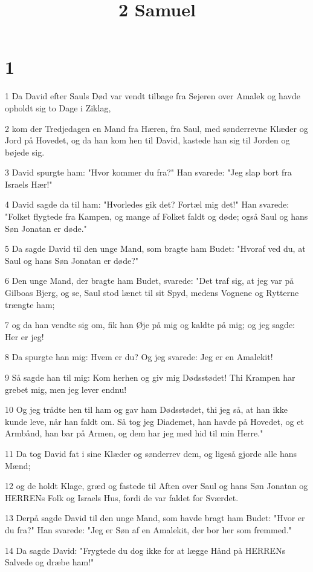 

\title{2 Samuel}


\chapter{1}

\par 1 Da David efter Sauls Død var vendt tilbage fra Sejeren over Amalek og havde opholdt sig to Dage i Ziklag,
\par 2 kom der Tredjedagen en Mand fra Hæren, fra Saul, med sønderrevne Klæder og Jord på Hovedet, og da han kom hen til David, kastede han sig til Jorden og bøjede sig.
\par 3 David spurgte ham: "Hvor kommer du fra?" Han svarede: "Jeg slap bort fra Israels Hær!"
\par 4 David sagde da til ham: "Hvorledes gik det? Fortæl mig det!" Han svarede: "Folket flygtede fra Kampen, og mange af Folket faldt og døde; også Saul og hans Søn Jonatan er døde."
\par 5 Da sagde David til den unge Mand, som bragte ham Budet: "Hvoraf ved du, at Saul og hans Søn Jonatan er døde?"
\par 6 Den unge Mand, der bragte ham Budet, svarede: "Det traf sig, at jeg var på Gilboas Bjerg, og se, Saul stod lænet til sit Spyd, medens Vognene og Rytterne trængte ham;
\par 7 og da han vendte sig om, fik han Øje på mig og kaldte på mig; og jeg sagde: Her er jeg!
\par 8 Da spurgte han mig: Hvem er du? Og jeg svarede: Jeg er en Amalekit!
\par 9 Så sagde han til mig: Kom herhen og giv mig Dødsstødet! Thi Krampen har grebet mig, men jeg lever endnu!
\par 10 Og jeg trådte hen til ham og gav ham Dødsstødet, thi jeg så, at han ikke kunde leve, når han faldt om. Så tog jeg Diademet, han havde på Hovedet, og et Armbånd, han bar på Armen, og dem har jeg med hid til min Herre."
\par 11 Da tog David fat i sine Klæder og sønderrev dem, og ligeså gjorde alle hans Mænd;
\par 12 og de holdt Klage, græd og fastede til Aften over Saul og hans Søn Jonatan og HERRENs Folk og Israels Hus, fordi de var faldet for Sværdet.
\par 13 Derpå sagde David til den unge Mand, som havde bragt ham Budet: "Hvor er du fra?" Han svarede: "Jeg er Søn af en Amalekit, der bor her som fremmed."
\par 14 Da sagde David: "Frygtede du dog ikke for at lægge Hånd på HERRENs Salvede og dræbe ham!"
